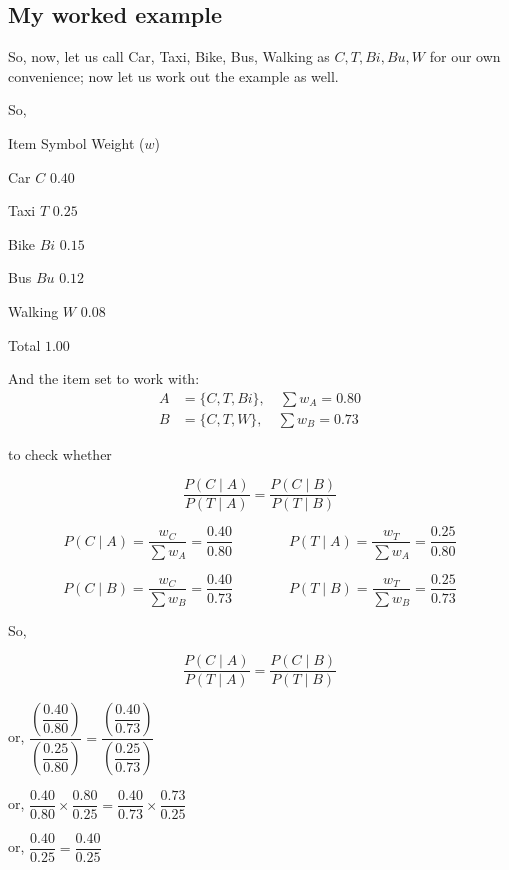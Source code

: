 \documentclass{article}
\begin{document}
\subsection*{My worked example}

So, now, let us call Car, Taxi, Bike, Bus, Walking as
$C, T, Bi, Bu, W$ for our own convenience; now let us work out
the example as well.

So,

Item \quad Symbol \quad Weight ($w$)

Car \quad\quad $C$ \quad\quad $0.40$

Taxi \quad\quad $T$ \quad\quad $0.25$

Bike \quad\quad $Bi$ \quad\quad $0.15$

Bus \quad\quad $Bu$ \quad\quad $0.12$

Walking \quad $W$ \quad\quad $0.08$

\hspace{1.6cm} Total \quad $1.00$

And the item set to work with:
\begin{align*}
    A &= \{C, T, Bi\}, \quad \sum w_A = 0.80 \\
    B &= \{C, T, W\}, \quad \sum w_B = 0.73
\end{align*}

to check whether

\begin{equation*}
    \frac{P(C \mid A)}{P(T \mid A)} = \frac{P(C \mid B)}{P(T \mid B)}
\end{equation*}

\[
P(C \mid A) = \frac{w_C}{\sum w_A} = \frac{0.40}{0.80}
\qquad\qquad
P(T \mid A) = \frac{w_T}{\sum w_A} = \frac{0.25}{0.80}
\]

\[
P(C \mid B) = \frac{w_C}{\sum w_B} = \frac{0.40}{0.73}
\qquad\qquad
P(T \mid B) = \frac{w_T}{\sum w_B} = \frac{0.25}{0.73}
\]

So,

\begin{equation*}
    \frac{P(C \mid A)}{P(T \mid A)} = \frac{P(C \mid B)}{P(T \mid B)}
\end{equation*}

or, \quad
$\dfrac{\left(\dfrac{0.40}{0.80}\right)}{\left(\dfrac{0.25}{0.80}\right)}
= \dfrac{\left(\dfrac{0.40}{0.73}\right)}{\left(\dfrac{0.25}{0.73}\right)}$

or, \quad
$\dfrac{0.40}{0.80} \times \dfrac{0.80}{0.25}
= \dfrac{0.40}{0.73} \times \dfrac{0.73}{0.25}$

or, \quad $\dfrac{0.40}{0.25} = \dfrac{0.40}{0.25}$
\end{document}
